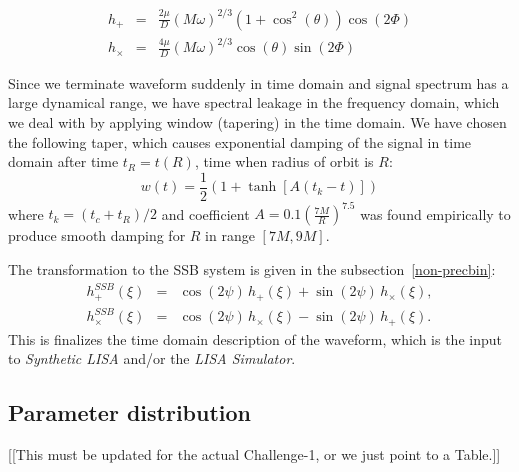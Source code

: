 \documentclass[11pt]{report}
\def\be{\begin{equation}}
\def\bea{\begin{eqnarray}}
\def\en{\end{equation}}
\def\ena{\end{eqnarray}}
\begin{document}
\bea
h_{+} &=& \frac{2\mu}{D}(M\omega)^{2/3}(1+\cos^2(\theta))\cos(2\Phi)
\label{hp}\\
h_{\times} &=& \frac{4\mu}{D}(M\omega)^{2/3}\cos(\theta)\sin(2\Phi)
\label{hc}
\ena

Since we terminate waveform suddenly in time domain and signal spectrum has a large dynamical range, we have spectral leakage in the 
frequency domain, which we deal with by applying window
(tapering) in the time domain. We have chosen the following taper,
which causes exponential damping of the signal in time domain 
after time $t_R = t(R)$, time when radius of orbit is $R$:
\be
w(t) = \frac1{2}\left( 1 + \tanh\left[A(t_{k} - t)\right]  \right)
\en
where $t_k = (t_c + t_R)/2$ and coefficient $A = 0.1\left(\frac{7M}{R}
\right)^{7.5}$ was found empirically to produce smooth damping 
for $R$ in range $[7M, 9M]$.


The transformation to the SSB system is given in the subsection~\ref{non-precbin}:
\bea
h_{+}^{SSB}(\xi) &=& \cos (2\psi) \, h_+(\xi)  + \sin (2 \psi) \, h_\times(\xi), \\
h_\times^{SSB}(\xi) &=& \cos (2\psi) \, h_\times(\xi)  - \sin (2 \psi) \, h_+(\xi).
\ena
 This is finalizes the time domain description of the 
waveform, which is the input to {\it Synthetic LISA} and/or the {\it LISA Simulator}.

\subsection{Parameter distribution}
[[This must be updated for the actual Challenge-1, or we just point to a Table.]]
\end{document}
